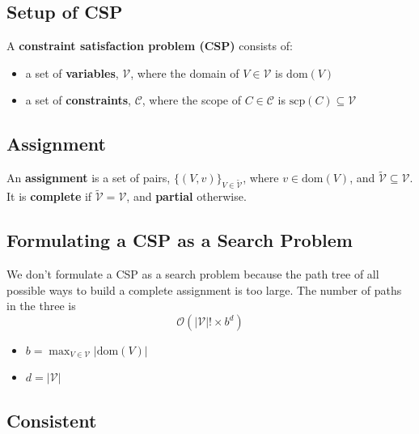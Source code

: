 \subsection{Setup of CSP}
\begin{definition}
    A \textbf{constraint satisfaction problem (CSP)} consists of:
    \begin{itemize}
        \item a set of \textbf{variables}, $\mathcal{V}$, where the domain of $V \in \mathcal{V}$ is $\text{dom}(V)$
        \item a set of \textbf{constraints}, $\mathcal{C}$, where the scope of $C \in \mathcal{C}$ is $\text{scp}(C) \subseteq \mathcal{V}$
    \end{itemize}
\end{definition}

\subsection{Assignment}
\begin{definition}
    An \textbf{assignment} is a set of pairs, \(\{(V, v)\}_{V \in \tilde{\mathcal{V}}}\), where \(v \in \text{dom}(V)\), and \(\tilde{\mathcal{V}} \subseteq \mathcal{V}\). It is \textbf{complete} if \(\tilde{\mathcal{V}} = \mathcal{V}\), and \textbf{partial} otherwise.
\end{definition}

\subsection{Formulating a CSP as a Search Problem}
\begin{motivation}
    We don't formulate a CSP as a search problem because the path tree of all possible ways to build a complete assignment is too large. The number of paths in the three is 
    \begin{equation*}
        \mathcal{O} \left(|\mathcal{V}|! \times b^d \right)
    \end{equation*}
    \begin{itemize}
        \item $b= \max_{V \in \mathcal{V}} |\text{dom}(V)|$
        \item $d = |\mathcal{V}|$
    \end{itemize}
\end{motivation}

\subsection{Consistent}
